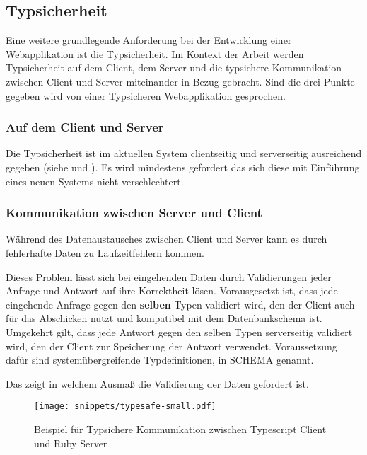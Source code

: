 \subsection{Typsicherheit}
\label{req:typesafe}
Eine weitere grundlegende Anforderung bei der Entwicklung einer Webapplikation ist die Typsicherheit.
Im Kontext der Arbeit werden Typsicherheit auf dem Client,
dem Server und die typsichere Kommunikation zwischen Client und Server miteinander in Bezug gebracht.
Sind die drei Punkte gegeben wird von einer Typsicheren Webapplikation gesprochen.

\subsubsection{Auf dem Client und Server}
\label{req:typesafe:client}
Die Typsicherheit ist im aktuellen System clientseitig und serverseitig ausreichend gegeben (siehe  und ).
Es wird mindestens gefordert das sich diese mit Einführung eines neuen Systems nicht verschlechtert.

\subsubsection{Kommunikation zwischen Server und Client}
\label{req:typesafe:api}
Während des Datenaustausches zwischen Client und Server kann es durch fehlerhafte Daten zu Laufzeitfehlern kommen.

Dieses Problem lässt sich bei eingehenden Daten durch Validierungen jeder Anfrage und Antwort auf ihre Korrektheit lösen.
Vorausgesetzt ist, dass jede eingehende Anfrage gegen den \textbf{selben} Typen validiert wird,
den der Client auch für das Abschicken nutzt und kompatibel mit dem Datenbankschema ist.
Umgekehrt gilt, dass jede Antwort gegen den selben Typen serverseitig validiert wird, den der Client zur Speicherung der Antwort verwendet.
Voraussetzung dafür sind systemübergreifende Typdefinitionen, in  SCHEMA genannt.

Das  zeigt in welchem Ausmaß die Validierung der Daten gefordert ist.

\begin{figure}[h!]
    \centering
    \texttt{[image: snippets/typesafe-small.pdf]}
    \caption{Beispiel für Typsichere Kommunikation zwischen Typescript Client und Ruby Server}
    \label{req:typesafe:example}
\end{figure}

